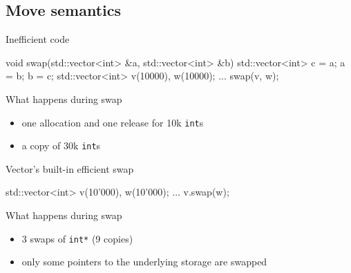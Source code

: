 \subsection[mv]{Move semantics}

\begin{frame}[fragile]
  \begin{exampleblock}{Inefficient code}
    \begin{cppcode*}{}
      void swap(std::vector<int> &a,
                std::vector<int> &b) {
        std::vector<int> c = a;
        a = b;
        b = c;
      }
      std::vector<int> v(10000), w(10000);
      ...
      swap(v, w);
    \end{cppcode*}
  \end{exampleblock}
  \pause
  \begin{alertblock}{What happens during swap}
    \begin{itemize}
    \item one allocation and one release for 10k \texttt{int}s
    \item a copy of 30k \texttt{int}s
    \end{itemize}
  \end{alertblock}
\end{frame}

\begin{frame}[fragile]
  \begin{exampleblock}{Vector's built-in efficient swap}
    \begin{cppcode*}{}
      std::vector<int> v(10'000), w(10'000);
      ...
      v.swap(w);
      \end{cppcode*}
  \end{exampleblock}
  \pause
  \begin{block}{What happens during swap}
    \begin{itemize}
    \item 3 swaps of \texttt{int*} (9 copies)
    \item only some pointers to the underlying storage are swapped
    \end{itemize}
  \end{block}
\end{frame}

